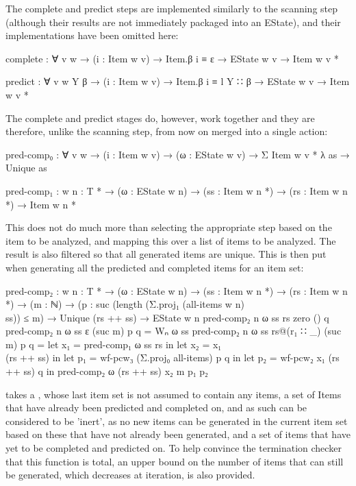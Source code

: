 		The complete and predict steps are implemented similarly to the
		scanning step (although their results are not immediately packaged into
		an EState), and their implementations have been omitted here:

		\begin{code}
			complete : ∀ {v w} → (i : Item w v) → Item.β i ≡ ε →
			  EState w v → Item w v *

			predict : ∀ {v w Y β} → (i : Item w v) → Item.β i ≡ l Y ∷ β →
			  EState w v → Item w v *
		\end{code}

 		The complete and predict stages do, however, work together and they are
 		therefore, unlike the scanning step, from now on merged into a single
 		action:

		\begin{code}
			pred-comp₀ : ∀ {v w} →
			  (i : Item w v) →
			  (ω : EState w v) →
			  Σ {Item w v *} λ as → Unique as

			pred-comp₁ : {w n : T *} → (ω : EState w n) →
			  (ss : Item w n *) → (rs : Item w n *) → Item w n *
		\end{code}

		This does not do much more than selecting the appropriate step based on
		the item to be analyzed, and mapping this over a list of items to be
		analyzed. The result is also filtered so that all generated items are
		unique. This is then put when generating all the predicted and
		completed items for an item set:

		\begin{code}
			pred-comp₂ : {w n : T *} →
			  (ω : EState w n) →
			  (ss : Item w n *) →
			  (rs : Item w n *) →
			  (m : ℕ) →
			  (p : suc (length (Σ.proj₁ (all-items {w} {n}) \\ ss)) ≤ m) →
			  Unique (rs ++ ss) →
			  EState w n
			pred-comp₂ {n} ω ss rs zero () q
			pred-comp₂ {n} ω ss ε (suc m) p q = Wₙ ω ss
			pred-comp₂ {n} ω ss rs@(r₁ ∷ _) (suc m) p q =
			  let x₁ = pred-comp₁ ω ss rs in
			  let x₂ = x₁ \\ (rs ++ ss) in
			  let p₁ = wf-pcw₃ (Σ.proj₀ all-items) p q in
			  let p₂ = wf-pcw₂ x₁ (rs ++ ss) q in
			  pred-comp₂ ω (rs ++ ss) x₂ m p₁ p₂
		\end{code}

		 takes a , whose last item set is not
		assumed to contain any items, a set of Items that have already been
		predicted and completed on, and as such can be considered to be
		'inert', as no new items can be generated in the current item set based
		on these that have not already been generated, and a set of items that
		have yet to be completed and predicted on. To help convince the
		termination checker that this function is total, an upper bound on the
		number of items that can still be generated, which decreases at
		iteration, is also provided.

